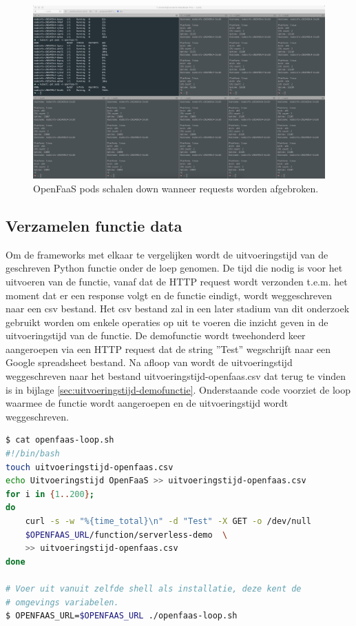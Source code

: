 \begin{figure}
    \includegraphics[width=1\textwidth]{img/openfaas-scalability-3.png}
    \caption{OpenFaaS pods schalen down wanneer requests worden afgebroken.}
    \label{fig:openfaas-scalability-3}  
\end{figure}

\subsection{Verzamelen functie data}
Om de frameworks met elkaar te vergelijken wordt de uitvoeringstijd van de geschreven Python functie onder de loep genomen. De tijd die nodig is voor het uitvoeren van de functie, vanaf dat de HTTP request wordt verzonden t.e.m. het moment dat er een response volgt en de functie eindigt, wordt weggeschreven naar een csv bestand. Het csv bestand zal in een later stadium van dit onderzoek gebruikt worden om enkele operaties op uit te voeren die inzicht geven in de uitvoeringstijd van de functie. De demofunctie wordt tweehonderd keer aangeroepen via een HTTP request dat de string ''Test'' wegschrijft naar een Google spreadsheet bestand. Na afloop van wordt de uitvoeringstijd weggeschreven naar het bestand uitvoeringstijd-openfaas.csv dat terug te vinden is in bijlage \ref{sec:uitvoeringstijd-demofunctie}. Onderstaande code voorziet de loop waarmee de functie wordt aangeroepen en de uitvoeringstijd wordt weggeschreven. 

\begin{lstlisting}[language=bash]
$ cat openfaas-loop.sh
#!/bin/bash
touch uitvoeringstijd-openfaas.csv
echo Uitvoeringstijd OpenFaaS >> uitvoeringstijd-openfaas.csv
for i in {1..200};
do
    curl -s -w "%{time_total}\n" -d "Test" -X GET -o /dev/null
    $OPENFAAS_URL/function/serverless-demo  \
    >> uitvoeringstijd-openfaas.csv
done

# Voer uit vanuit zelfde shell als installatie, deze kent de 
# omgevings variabelen.
$ OPENFAAS_URL=$OPENFAAS_URL ./openfaas-loop.sh
\end{lstlisting}

